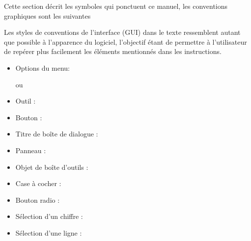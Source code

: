 \newpage
{}\label{label_conventions}

Cette section décrit les symboles qui ponctuent ce manuel, les conventions graphiques sont les suivantes


Les styles de conventions de l'interface (GUI) dans le texte ressemblent autant que possible à l'apparence du logiciel, l'objectif étant de permettre à l'utilisateur de repérer plus facilement les éléments mentionnés dans les instructions.

\begin{itemize}[label=--,itemsep=5pt]
\item Options du menu:  \fleche %

ou

 \fleche %
 \fleche {}
\item Outil : 
\item Bouton : 
\item Titre de boîte de dialogue : 
\item Panneau : 

% 
% 
% 
% 
% 
\item Objet de boîte d'outils :  
\item Case à cocher : 
\item Bouton radio :   
\item Sélection d'un chiffre : 
\item Sélection d'une ligne : 



\end{itemize}
